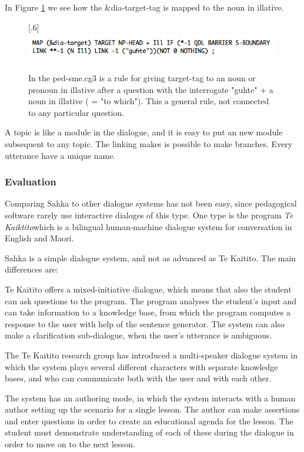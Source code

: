 \documentclass[a4paper,12pt]{article}
\begin{document}
In Figure \ref{targetIll} we see how the \&dia-target-tag is mapped to the noun in illative.

\begin{figure}[htbp]
\begin{center}
\scalebox{.6}[.6]{\includegraphics{img/targetIll.png}}
\caption{In the ped-sme.cg3 is a rule for giving target-tag to an noun or pronoun in illative after a question with the interrogate "guhte" + a noun in illative ( = "to which"). This a general rule, not connected to any particular question.}
\label{targetIll}
\end{center}
\end{figure}


A topic is like a module in the dialogue, and it is easy to put an new module subsequent to any topic. The linking makes is possible to make branches. Every utterance have a unique name.  

\subsubsection{Evaluation}

Comparing Sahka to other dialogue systems has not been easy, since pedagogical software rarely use interactive dialoges of this type. One type is the program \textit{Te Kaiktito}which is a bilingual human-machine dialogue system for conversation in English and Maori.

Sahka is a simple dialogue system, and not as advanced as Te Kaitito. The main differences are:

Te Kaitito offers a mixed-initiative dialogue, which means that also the student can ask questions to the program. The program analyses the student's input and can take information to a knowledge base, from which the program computes a response to the user with help of the sentence generator. The system can also make a clarification sub-dialogue, when the user's utterance is ambiguous. \citep{KnotMoorMean200350}

The Te Kaitito research group has introduced a multi-speaker dialogue system in which the system plays several different characters with separate knowledge bases, and who can communicate both with the user and with each other.   
\citep{VlugterKnott06}

The system has an authoring mode, in which the system interacts with a human author setting up the scenario for a single lesson. The author can make assertions and enter questions in order to create an educational agenda for the lesson. The student must demonstrate understanding of each of these during the dialogue in order to move on to the next lesson. \citep{VlugterKnotWeatherall04} \citep{VlugterKnott06}
\end{document}
